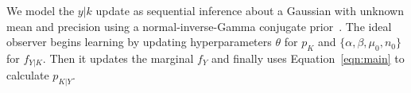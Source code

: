\documentclass[10pt,letterpaper]{article}
\begin{document}


We model the $y|k$ update as sequential inference about a Gaussian with unknown mean and precision using a normal-inverse-Gamma conjugate prior~\cite{murphy2007conjugate}. The ideal observer begins learning by updating hyperparameters $\theta$ for $p_K$ and $\{\alpha, \beta, \mu_0, n_0\}$ for $f_{Y|K}$. Then it updates the marginal $f_Y$ and finally uses Equation~\ref{eqn:main} to calculate $p_{K|Y}$. 




\end{document}
